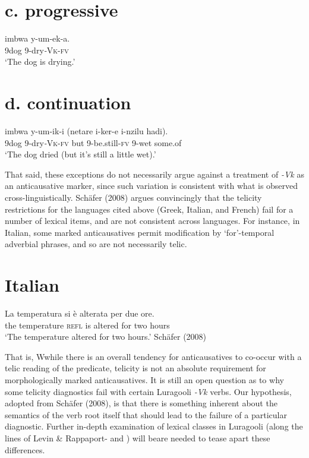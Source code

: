 \documentclass[output=paper]{langsci/langscibook}
\begin{document}
\begin{styleTabellenberschrift}
\chapter[c. progressive]{c. \textbf{progressive}}
\gll imbwa y-um-ek-a.\\
     9dog   9-dry\textit{{}-}\textsc{Vk}{}-\textsc{fv}\\
\glt ‘The dog is drying.’
\z

\chapter[d. continuation]{d. \textbf{continuation}}
\gll imbwa y-um-ik-i      (netare i-ker-e         i-nzilu hadi).\\
     9dog   9-dry\textit{{}-}\textsc{Vk}{}-\textsc{fv} but       9-be.still-\textsc{fv} 9-wet some.of\\
\glt ‘The dog dried (but it’s still a little wet).’
\z

That said, these exceptions do not necessarily argue against a treatment of \textit{{}-Vk} as an anticausative marker, since such variation is consistent with what is observed cross-linguistically. Schäfer (2008) argues convincingly that the telicity restrictions for the languages cited above (Greek, Italian, and French) fail for a number of lexical items, and are not consistent across languages. For instance, in Italian, some marked anticausatives permit modification by ‘for’-temporal adverbial phrases, and so are not necessarily telic.

\chapter[Italian]{Italian}
\gll La temperatura  si     è   alterata per  due ore.\\
     the temperature \textsc{refl} is  altered  for   two hours\\
\glt ‘The temperature altered for two hours.’        Schäfer (2008)
\z

That is, Wwhile there is an overall tendency for anticausatives to co-occur with a telic reading of the predicate, telicity is not an absolute requirement for morphologically marked anticausatives. It is still an open question as to why some telicity diagnostics fail with certain Luragooli \textit{{}-Vk} verbs. Our hypothesis, adopted from Schäfer (2008), is that there is something inherent about the semantics of the verb root itself that should lead to the failure of a particular diagnostic. Further in-depth examination of lexical classes in Luragooli (along the lines of Levin \& Rappaport-\citet{Hovav1995} and \citet{Haspelmath2005}) will beare needed to tease apart these differences. 


\end{styleTabellenberschrift}
\end{document}

